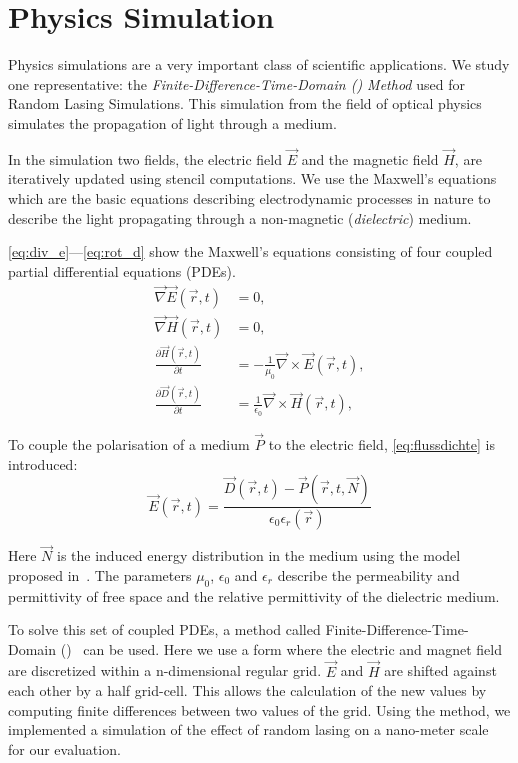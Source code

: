 \section{Physics Simulation}
\label{sec:physicsSim}

Physics simulations are a very important class of scientific applications.
We study one representative: the \emph{Finite-Difference-Time-Domain (\FDTD) Method} used for Random Lasing Simulations.
This simulation from the field of optical physics simulates the propagation of light through a medium.

In the simulation two fields, the electric field $\vec{E}$ and the magnetic field $\vec{H}$, are iteratively updated using stencil computations.
We use the Maxwell's equations which are the basic equations describing electrodynamic processes in nature to describe the light propagating through a non-magnetic (\emph{dielectric}) medium.

\autoref{eq:div_e}---\autoref{eq:rot_d} show the Maxwell's equations consisting of four coupled partial differential equations (PDEs).
\begin{align}
  \vec{\nabla}\vec{E}\left(\vec{r}, t\right) &= 0, \label{eq:div_e}\\
  \vec{\nabla}\vec{H}\left(\vec{r}, t\right) &= 0, \label{eq:div_h}\\
  \frac{\partial\vec{H}\left(\vec{r}, t\right)}{\partial t} &= -\frac{1}{\mu_0}\vec{\nabla} \times \vec{E}\left(\vec{r}, t\right), \label{eq:rot_h}\\
  \frac{\partial\vec{D}\left(\vec{r}, t\right)}{\partial t} &= \frac{1}{\epsilon_0}\vec{\nabla} \times \vec{H}\left(\vec{r}, t\right), \label{eq:rot_d}
\end{align}

\noindent
To couple the polarisation of a medium $\vec{P}$ to the electric field, \autoref{eq:flussdichte} is introduced:
\begin{equation}
\vec{E}\left(\vec{r}, t\right) = \frac{\vec{D}\left(\vec{r}, t\right) - \vec{P}\left(\vec{r}, t, \vec{N}\right)}{\epsilon_0\epsilon_r\left(\vec{r}\right)}
\label{eq:flussdichte}
\end{equation}

\noindent
Here $\vec{N}$ is the induced energy distribution in the medium using the model proposed in~\cite{Jiang2000}.
The parameters $\mu_0$, $\epsilon_0$ and $\epsilon_r$ describe the permeability and permittivity of free space and the relative permittivity of the dielectric medium.

To solve this set of coupled PDEs, a method called Finite-Difference-Time-Domain (\FDTD)~\cite{Yee1966} can be used.
Here we use a form where the electric and magnet field are discretized within a n-dimensional regular grid.
$\vec{E}$ and $\vec{H}$ are shifted against each other by a half grid-cell.
This allows the calculation of the new values by computing finite differences between two values of the grid.
Using the \FDTD method, we implemented a simulation of the effect of random lasing on a nano-meter scale~\cite{Cao1999} for our evaluation.

